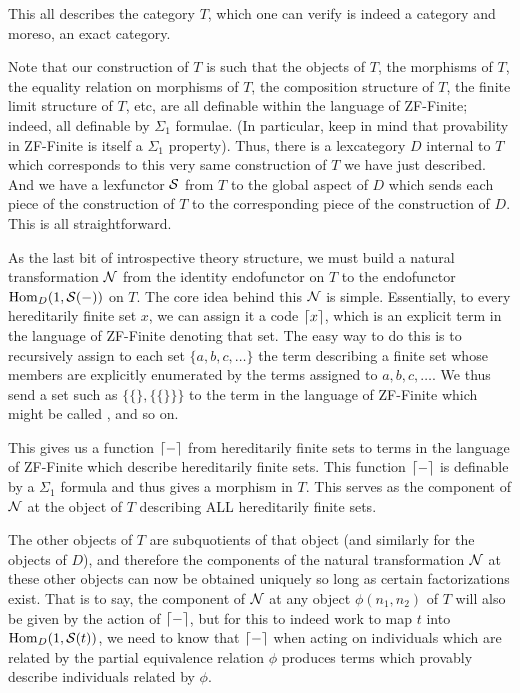 This all describes the category $T$, which one can verify is indeed a category and moreso, an exact category.

Note that our construction of $T$ is such that the objects of $T$, the morphisms of $T$, the equality relation on morphisms of $T$, the composition structure of $T$, the finite limit structure of $T$, etc, are all definable within the language of ZF-Finite; indeed, all definable by $\Sigma_1$ formulae. (In particular, keep in mind that provability in ZF-Finite is itself a $\Sigma_1$ property). Thus, there is a lexcategory $D$ internal to $T$ which corresponds to this very same construction of $T$ we have just described. And we have a lexfunctor $\mathcal{S}$ from $T$ to the global aspect of $D$ which sends each piece of the construction of $T$ to the corresponding piece of the construction of $D$. This is all straightforward.

As the last bit of introspective theory structure, we must build a natural transformation $\mathcal{N}$ from the identity endofunctor on $T$ to the endofunctor $\operatorname{Hom}_D(1, \mathcal{S}(-))$ on $T$. The core idea behind this $\mathcal{N}$ is simple. Essentially, to every hereditarily finite set $x$, we can assign it a code $\lceil x \rceil$, which is an explicit term in the language of ZF-Finite denoting that set. The easy way to do this is to recursively assign to each set $\{a, b, c, \ldots\}$ the term describing a finite set whose members are explicitly enumerated by the terms assigned to $a, b, c, \ldots$. We thus send a set such as $\{\{\}, \{\{\}\}\}$ to the term in the language of ZF-Finite which might be called \quote{$\{\{\}, \{\{\}\}\}$}, and so on. 

This gives us a function $\lceil - \rceil$ from hereditarily finite sets to terms in the language of ZF-Finite which describe hereditarily finite sets. This function $\lceil - \rceil$ is definable by a $\Sigma_1$ formula and thus gives a morphism in $T$. This serves as the component of $\mathcal{N}$ at the object of $T$ describing ALL hereditarily finite sets. 

The other objects of $T$ are subquotients of that object (and similarly for the objects of $D$), and therefore the components of the natural transformation $\mathcal{N}$ at these other objects can now be obtained uniquely so long as certain factorizations exist. That is to say, the component of $\mathcal{N}$ at any object $\phi(n_1, n_2)$ of $T$ will also be given by the action of $\lceil - \rceil$, but for this to indeed work to map $t$ into $\operatorname{Hom}_D(1, \mathcal{S}(t))$, we need to know that $\lceil - \rceil$ when acting on individuals which are related by the partial equivalence relation $\phi$ produces terms which provably describe individuals related by $\phi$.

